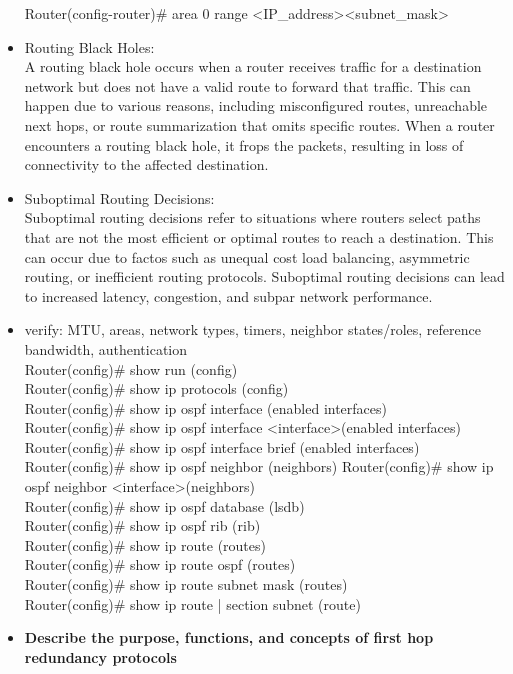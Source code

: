 \documentclass{article}
\begin{document}
\begin{itemize}
  		Router(config-router)\# area 0 range \textless IP\_address\textgreater \textless subnet\_mask\textgreater
  	\item[] Routing Black Holes:\\
  		A routing black hole occurs when a router receives traffic for a destination network but does not have a valid route to forward that traffic. This can happen due to various reasons, including misconfigured routes, unreachable next hops, or route summarization that omits specific routes. When a router encounters a routing black hole, it frops the packets, resulting in loss of connectivity to the affected destination.
  	\item[] Suboptimal Routing Decisions:\\
  		Suboptimal routing decisions refer to situations where routers select paths that are not the most efficient or optimal routes to reach a destination. This can occur due to factos such as unequal cost load balancing, asymmetric routing, or inefficient routing protocols. Suboptimal routing decisions can lead to increased latency, congestion, and subpar network performance.
  		
  	\item[] verify: MTU, areas, network types, timers, neighbor states/roles, reference bandwidth, authentication\\
  		Router(config)\# show run (config)\\
  		Router(config)\# show ip protocols (config)\\
  		
  		Router(config)\# show ip ospf interface (enabled interfaces)\\
  		Router(config)\# show ip ospf interface \textless interface\textgreater (enabled interfaces)\\
  		Router(config)\# show ip ospf interface brief (enabled interfaces)\\
  		
  		Router(config)\# show ip ospf neighbor (neighbors)
  		Router(config)\# show ip ospf neighbor \textless interface\textgreater (neighbors)\\
  		
  		Router(config)\# show ip ospf database (lsdb)\\
  		
  		Router(config)\# show ip ospf rib (rib)\\
  		
  		Router(config)\# show ip route (routes)\\
  		Router(config)\# show ip route ospf (routes)\\
  		Router(config)\# show ip route subnet mask (routes)\\
  		Router(config)\# show ip route | section subnet (route)
  \item \textbf{Describe the purpose, functions, and concepts of first hop redundancy protocols}\\
\end{itemize}
\end{document}
